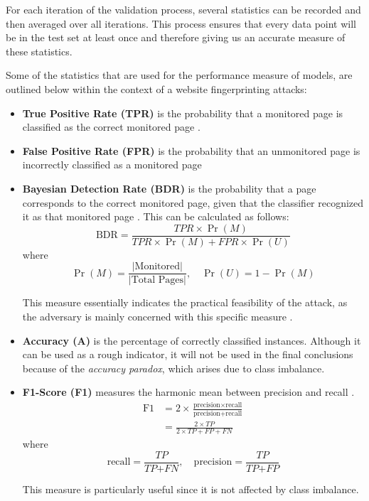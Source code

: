For each iteration of the validation process, several statistics can be recorded and then averaged over all iterations.
This process ensures that every data point will be in the test set at least once and therefore giving us an accurate measure of these statistics.

Some of the statistics that are used for the performance measure of models, are outlined below within the context of a website fingerprinting attacks:
\begin{itemize}
  \item \textbf{True Positive Rate (TPR)} is the probability that a monitored page is classified as the correct monitored page \cite{kfingerprinting}.

  \item \textbf{False Positive Rate (FPR)} is the probability that an unmonitored page is incorrectly classified as a monitored page \cite{kfingerprinting}

  \item \textbf{Bayesian Detection Rate (BDR)} is the probability that a page corresponds to the correct monitored page, given that the classifier recognized it as that monitored page \cite{kfingerprinting}.
    This can be calculated as follows:
    $$\text{BDR} = \frac{\textit{TPR} \times \Pr(M)}{\textit{TPR} \times \Pr(M) + \textit{FPR} \times \Pr(U)}$$
    where
    $$\Pr(M) = \frac{|\text{Monitored}|}{|\text{Total Pages}|}, \quad \Pr(U) = 1 - \Pr(M)$$

    This measure essentially indicates the practical feasibility of the attack, as the adversary is mainly concerned with this specific measure \cite{kfingerprinting}.

  \item \textbf{Accuracy (A)} is the percentage of correctly classified instances.
    Although it can be used as a rough indicator, it will not be used in the final conclusions because of the \textit{accuracy paradox}, which arises due to class imbalance.

  \item \textbf{F1-Score (F1)} measures the harmonic mean between precision and recall \cite{scikitlearn}.
    \begin{align*}
      \text{F1} &= 2 \times \frac{\text{precision} \times \text{recall}}{\text{precision} + \text{recall}}\\
                &= \frac{2 \times \textit{TP}}{2 \times \textit{TP} + \textit{FP} + \textit{FN}}
    \end{align*}
    where
    $$\text{recall} = \frac{\textit{TP}}{\textit{TP} + \textit{FN}}, \quad \text{precision} = \frac{\textit{TP}}{\textit{TP} + \textit{FP}}$$

    This measure is particularly useful since it is not affected by class imbalance.
\end{itemize}

